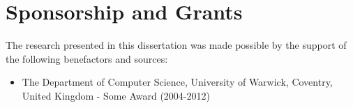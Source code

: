 
\chapter*{Sponsorship and Grants}

The research presented in this dissertation was made possible by the support of the following benefactors and sources:

\begin{itemize}

\item The Department of Computer Science, University of Warwick, Coventry, United Kingdom - Some Award (2004-2012)


\end{itemize}
